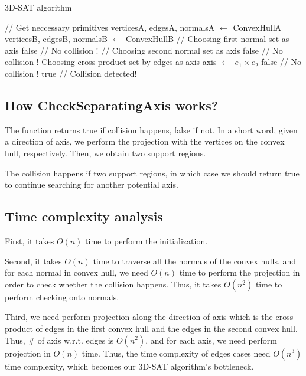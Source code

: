 \documentclass[acmtog]{acmart}
\begin{document}
	\begin{algorithm}
	\caption{3D-SAT algorithm}
	\begin{algorithmic}[2]
		\STATE // Get neccessary primitives
		\STATE verticesA, edgesA, normalsA $\leftarrow$ ConvexHullA
		\STATE verticesB, edgesB, normalsB $\leftarrow$ ConvexHullB
		\STATE // Choosing first normal set as axis
				\RETURN false // No collision !
			\ENDIF
		\ENDFOR
		\STATE // Choosing second normal set as axis
				\RETURN false // No collision !
			\ENDIF
		\ENDFOR
		\STATE Choosing cross product set by edges as axis
				\STATE axis $\leftarrow$ $e_1\times e_2$
					\RETURN false // No collision !
				\ENDIF
			\ENDFOR
		\ENDFOR 
		\RETURN true // Collision detected!
	\end{algorithmic}
\end{algorithm}

\subsection*{How CheckSeparatingAxis works?}
		The function returns true if collision happens, false if not. In a short word, given a direction of axis, we perform the projection with the vertices on the convex hull, respectively. Then, we obtain two support regions.  
		
		\quad The collision happens if two support regions, in which case we should return true to continue searching for another potential axis.
		
\subsection*{Time complexity analysis}
	First, it takes $O(n)$ time to perform the initialization. 
	
	\quad Second, it takes $O(n)$ time to traverse all the normals of the convex hulls, and for each normal in convex hull, we need $O(n)$ time to perform the projection in order to check whether the collision happens. Thus, it takes $O(n^2)$ time to perform checking onto normals.

	\quad Third, we need perform projection along the direction of axis which is the cross product of edges in the first convex hull and the edges in the second convex hull. Thus, \# of axis w.r.t. edges is $O(n^2)$, and for each axis, we need perform projection in $O(n)$ time. Thus, the time complexity of edges cases need $O(n^3)$ time complexity, which becomes our 3D-SAT algorithm's bottleneck. 
	
\end{document}
